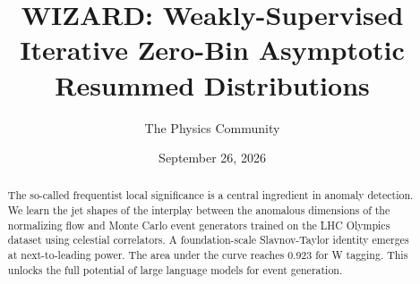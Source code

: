 \documentclass[11pt]{article}
\title{WIZARD: Weakly-Supervised Iterative Zero-Bin Asymptotic Resummed Distributions}
\author{The Physics Community}
\date{September 26, 2026}
\numberwithin{equation}{section}
\theoremstyle{definition}
\theoremstyle{remark}
\begin{document}
\maketitle
\begin{abstract}
The so-called frequentist local significance is a central ingredient in
anomaly detection. We learn the jet shapes of the interplay between the
anomalous dimensions of the normalizing flow and Monte Carlo event
generators trained on the LHC Olympics dataset using celestial
correlators. A foundation-scale Slavnov-Taylor identity emerges at
next-to-leading power. The area under the curve reaches 0.923 for W
tagging. This unlocks the full potential of large language models for
event generation.
\end{abstract}
\tableofcontents




\nocite{*}


\end{document}
